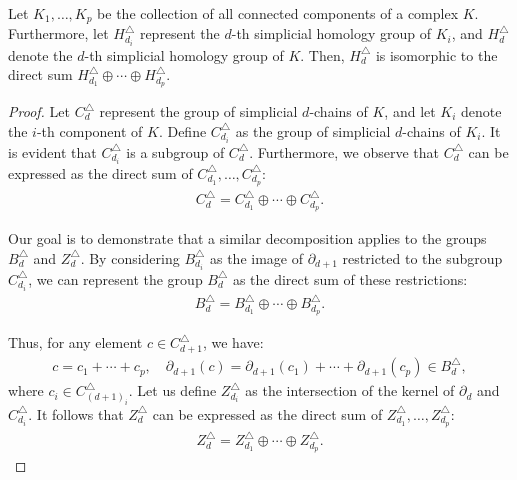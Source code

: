 \begin{proposition}{\cite[Proposition 2.6]{hatcher2005algebraic}}
	Let \( K_{1}, \ldots, K_{p} \) be the collection of all connected components of a complex \( K \). Furthermore, let \( H^{\triangle}_{d_i} \) represent the \( d \)-th simplicial homology group of \( K_{i} \), and \( H^{\triangle}_{d} \) denote the \( d \)-th simplicial homology group of \( K \). Then, \( H^{\triangle}_{d} \) is isomorphic to the direct sum \( H^{\triangle}_{d_1} \oplus \cdots \oplus H^{\triangle}_{d_p} \).
\end{proposition}

\begin{proof}
	Let \( C^{\triangle}_{d} \) represent the group of simplicial \( d \)-chains of \( K \), and let \( K_{i} \) denote the \( i \)-th component of \( K \). Define \( C^{\triangle}_{d_i} \) as the group of simplicial \( d \)-chains of \( K_{i} \). It is evident that \( C^{\triangle}_{d_i} \) is a subgroup of \( C^{\triangle}_{d} \). Furthermore, we observe that \( C^{\triangle}_{d} \) can be expressed as the direct sum of \( C^{\triangle}_{d_1}, \ldots, C^{\triangle}_{d_p} \):
	\begin{align}
		C^{\triangle}_{d} = C^{\triangle}_{d_1} \oplus \cdots \oplus C^{\triangle}_{d_p}. 
	\end{align}
				
	Our goal is to demonstrate that a similar decomposition applies to the groups \( B^{\triangle}_{d} \) and \( Z^{\triangle}_{d} \). By considering \( B^{\triangle}_{d_i} \) as the image of \( \partial_{d+1} \) restricted to the subgroup \( C^{\triangle}_{d_i} \), we can represent the group \( B^{\triangle}_{d} \) as the direct sum of these restrictions:
	\begin{align}
		B^{\triangle}_{d} = B^{\triangle}_{d_1} \oplus \cdots \oplus B^{\triangle}_{d_p}. 
	\end{align}
				
	Thus, for any element \( c \in C^{\triangle}_{d+1} \), we have:
	\begin{align}
		c = c_{1} + \cdots + c_{p}, \quad \partial_{d+1}(c) = \partial_{d+1}(c_{1}) + \cdots + \partial_{d+1}(c_{p}) \in B^{\triangle}_{d}, 
	\end{align}
	where \( c_{i} \in C^{\triangle}_{(d+1)_i} \). Let us define \( Z^{\triangle}_{d_i} \) as the intersection of the kernel of \( \partial_{d} \) and \( C^{\triangle}_{d_i} \). It follows that \( Z^{\triangle}_{d} \) can be expressed as the direct sum of \( Z^{\triangle}_{d_1}, \ldots, Z^{\triangle}_{d_p} \):
	\begin{align}
		Z^{\triangle}_{d} = Z^{\triangle}_{d_1} \oplus \cdots \oplus Z^{\triangle}_{d_p}. 
	\end{align}
				

\end{proof}
